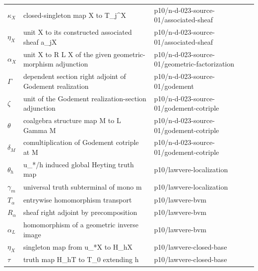 \begin{longtable}{@{}p{}p{}p{}@{}}
\(\kappa_X\) & closed-singleton map X to T\_j\^{}X & p10/\allowbreak{}n-\allowbreak{}d-\allowbreak{}023-\allowbreak{}source-\allowbreak{}01/\allowbreak{}associated-\allowbreak{}sheaf \\
\(\eta_X\) & unit X to its constructed associated sheaf a\_jX & p10/\allowbreak{}n-\allowbreak{}d-\allowbreak{}023-\allowbreak{}source-\allowbreak{}01/\allowbreak{}associated-\allowbreak{}sheaf \\
\(\alpha_X\) & unit X to R L X of the given geometric-morphism adjunction & p10/\allowbreak{}n-\allowbreak{}d-\allowbreak{}023-\allowbreak{}source-\allowbreak{}01/\allowbreak{}geometric-\allowbreak{}factorization \\
\(\Gamma\) & dependent section right adjoint of Godement realization & p10/\allowbreak{}n-\allowbreak{}d-\allowbreak{}023-\allowbreak{}source-\allowbreak{}01/\allowbreak{}godement \\
\(\zeta\) & unit of the Godement realization-section adjunction & p10/\allowbreak{}n-\allowbreak{}d-\allowbreak{}023-\allowbreak{}source-\allowbreak{}01/\allowbreak{}godement-\allowbreak{}cotriple \\
\(\theta\) & coalgebra structure map M to L Gamma M & p10/\allowbreak{}n-\allowbreak{}d-\allowbreak{}023-\allowbreak{}source-\allowbreak{}01/\allowbreak{}godement-\allowbreak{}cotriple \\
\(\delta_M\) & comultiplication of Godement cotriple at M & p10/\allowbreak{}n-\allowbreak{}d-\allowbreak{}023-\allowbreak{}source-\allowbreak{}01/\allowbreak{}godement-\allowbreak{}cotriple \\
\(\theta_h\) & u\_*/h induced global Heyting truth map & p10/\allowbreak{}lawvere-\allowbreak{}localization \\
\(\gamma_m\) & universal truth subterminal of mono m & p10/\allowbreak{}lawvere-\allowbreak{}localization \\
\(T_\alpha\) & entrywise homomorphism transport & p10/\allowbreak{}lawvere-\allowbreak{}bvm \\
\(R_\alpha\) & sheaf right adjoint by precomposition & p10/\allowbreak{}lawvere-\allowbreak{}bvm \\
\(\alpha_L\) & homomorphism of a geometric inverse image & p10/\allowbreak{}lawvere-\allowbreak{}bvm \\
\(\eta_X\) & singleton map from u\_*X to H\_hX & p10/\allowbreak{}lawvere-\allowbreak{}closed-\allowbreak{}base \\
\(\tau\) & truth map H\_hT to T\_0 extending h & p10/\allowbreak{}lawvere-\allowbreak{}closed-\allowbreak{}base \\

\end{longtable}

